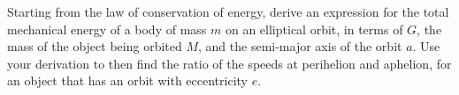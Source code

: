 Starting from the law of conservation of energy, derive an expression for the total mechanical energy of a body of mass $m$ on an elliptical orbit, in terms of $G$, the mass of the object being orbited $M$, and the semi-major axis of the orbit $a$. Use your derivation to then find the ratio of the speeds at perihelion and aphelion, for an object that has an orbit with eccentricity $e$.
